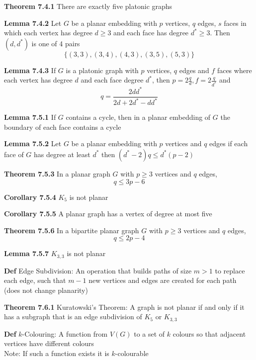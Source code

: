 \documentclass[11pt,notitlepage]{report}
\newcommand{\tbf}[1]{\textbf{#1}}
\begin{document}
\tbf{Theorem 7.4.1} There are exactly five platonic graphs

\tbf{Lemma 7.4.2} Let $G$ be a planar embedding with $p$ vertices, $q$ edges, $s$ faces in which each vertex has degree $d \geq 3$ and each face has degree $d^* \geq 3$. Then $(d, d^*)$ is one of 4 pairs
\vspace{-4mm}
$$\{(3,3),(3,4),(4,3),(3,5),(5,3)\}$$
\vspace{-7mm}

\tbf{Lemma 7.4.3} If $G$ is a platonic graph with $p$ vertices, $q$ edges and $f$ faces where each vertex has degree $d$ and each face degree $d^*$, then $p = 2\frac{q}{d}, f = 2\frac{q}{d^*}$ and
\vspace{-2mm}
$$q = \frac{2dd^*}{2d+2d^* - dd^*}$$
\vspace{-7mm}

\tbf{Lemma 7.5.1} If $G$ contains a cycle, then in a planar embedding of $G$ the boundary of each face contains a cycle

\tbf{Lemma 7.5.2} Let $G$ be a planar embedding with $p$ vertices and $q$ edges if each face of $G$ has degree at least $d^*$ then $(d^*-2)q \leq d^*(p-2)$

\tbf{Theorem 7.5.3} In a planar graph $G$ with $p \geq 3$ vertices and $q$ edges,
\vspace{-2mm}
$$q \leq 3p-6$$
\vspace{-5mm}

\tbf{Corollary 7.5.4} $K_5$ is not planar

\tbf{Corollary 7.5.5} A planar graph has a vertex of degree at most five

\tbf{Theorem 7.5.6} In a bipartite planar graph $G$ with $p \geq 3$ vertices and $q$ edges,
\vspace{-2mm}
$$q \leq 2p-4$$
\vspace{-8mm}

\tbf{Lemma 7.5.7} $K_{3,3}$ is not planar

\tbf{Def} Edge Subdivision: An operation that builds paths of size $m > 1$ to replace each edge, such that $m-1$ new vertices and edges are created for each path (does not change planarity)

\tbf{Theorem 7.6.1} Kuratowski's Theorem: A graph is not planar if and only if it has a subgraph that is an edge subdivision of $K_5$ or $K_{3,3}$

\tbf{Def} $k$-Colouring: A function from $V(G)$ to a set of $k$ colours so that adjacent vertices have different colours\\
\hspace*{8mm} Note: If such a function exists it is $k$-colourable
\end{document}
